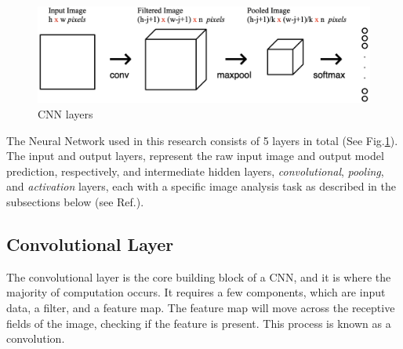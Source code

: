 \documentclass[conference]{IEEEtran}
\begin{document}
\begin{figure}[h]
  \centering
  \includegraphics[scale=0.2]{images/CNN_layers.png}
  \caption{CNN layers}
  \label{fig:Layers}
\end{figure}
\indent The Neural Network used in this research consists of 5 layers in total (See Fig.\ref{fig:Layers}). The input and output layers,
represent the raw input image and output model prediction, respectively, and intermediate hidden layers,
\textit{convolutional}, \textit{pooling}, and \textit{activation} layers, each with a specific image analysis task
as described in the subsections below (see Ref.\cite{CNNPart1_VZ_2019}).\\
\subsection{Convolutional Layer}

The convolutional layer is the core building block of a CNN, and it is where the majority of computation occurs. It requires a few components, which are input data, a filter, and a feature map. The feature map will move across the receptive fields of the image, checking if the feature is present. This process is known as a convolution.
\end{document}
